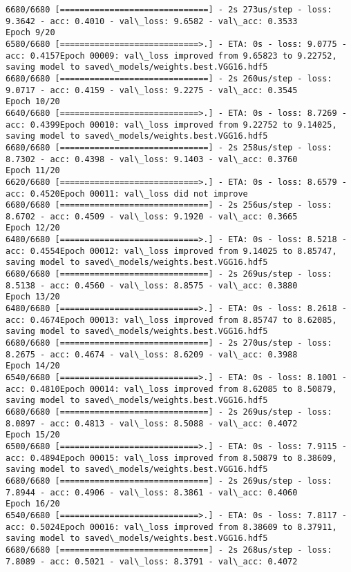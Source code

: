 \documentclass[11pt]{article}
\begin{document}
\begin{Verbatim}[commandchars=\\\{\}]
6680/6680 [==============================] - 2s 273us/step - loss: 9.3642 - acc: 0.4010 - val\_loss: 9.6582 - val\_acc: 0.3533
Epoch 9/20
6580/6680 [============================>.] - ETA: 0s - loss: 9.0775 - acc: 0.4157Epoch 00009: val\_loss improved from 9.65823 to 9.22752, saving model to saved\_models/weights.best.VGG16.hdf5
6680/6680 [==============================] - 2s 260us/step - loss: 9.0717 - acc: 0.4159 - val\_loss: 9.2275 - val\_acc: 0.3545
Epoch 10/20
6640/6680 [============================>.] - ETA: 0s - loss: 8.7269 - acc: 0.4399Epoch 00010: val\_loss improved from 9.22752 to 9.14025, saving model to saved\_models/weights.best.VGG16.hdf5
6680/6680 [==============================] - 2s 258us/step - loss: 8.7302 - acc: 0.4398 - val\_loss: 9.1403 - val\_acc: 0.3760
Epoch 11/20
6620/6680 [============================>.] - ETA: 0s - loss: 8.6579 - acc: 0.4520Epoch 00011: val\_loss did not improve
6680/6680 [==============================] - 2s 256us/step - loss: 8.6702 - acc: 0.4509 - val\_loss: 9.1920 - val\_acc: 0.3665
Epoch 12/20
6480/6680 [============================>.] - ETA: 0s - loss: 8.5218 - acc: 0.4554Epoch 00012: val\_loss improved from 9.14025 to 8.85747, saving model to saved\_models/weights.best.VGG16.hdf5
6680/6680 [==============================] - 2s 269us/step - loss: 8.5138 - acc: 0.4560 - val\_loss: 8.8575 - val\_acc: 0.3880
Epoch 13/20
6480/6680 [============================>.] - ETA: 0s - loss: 8.2618 - acc: 0.4674Epoch 00013: val\_loss improved from 8.85747 to 8.62085, saving model to saved\_models/weights.best.VGG16.hdf5
6680/6680 [==============================] - 2s 270us/step - loss: 8.2675 - acc: 0.4674 - val\_loss: 8.6209 - val\_acc: 0.3988
Epoch 14/20
6540/6680 [============================>.] - ETA: 0s - loss: 8.1001 - acc: 0.4810Epoch 00014: val\_loss improved from 8.62085 to 8.50879, saving model to saved\_models/weights.best.VGG16.hdf5
6680/6680 [==============================] - 2s 269us/step - loss: 8.0897 - acc: 0.4813 - val\_loss: 8.5088 - val\_acc: 0.4072
Epoch 15/20
6500/6680 [============================>.] - ETA: 0s - loss: 7.9115 - acc: 0.4894Epoch 00015: val\_loss improved from 8.50879 to 8.38609, saving model to saved\_models/weights.best.VGG16.hdf5
6680/6680 [==============================] - 2s 269us/step - loss: 7.8944 - acc: 0.4906 - val\_loss: 8.3861 - val\_acc: 0.4060
Epoch 16/20
6540/6680 [============================>.] - ETA: 0s - loss: 7.8117 - acc: 0.5024Epoch 00016: val\_loss improved from 8.38609 to 8.37911, saving model to saved\_models/weights.best.VGG16.hdf5
6680/6680 [==============================] - 2s 268us/step - loss: 7.8089 - acc: 0.5021 - val\_loss: 8.3791 - val\_acc: 0.4072

\end{Verbatim}
\end{document}
